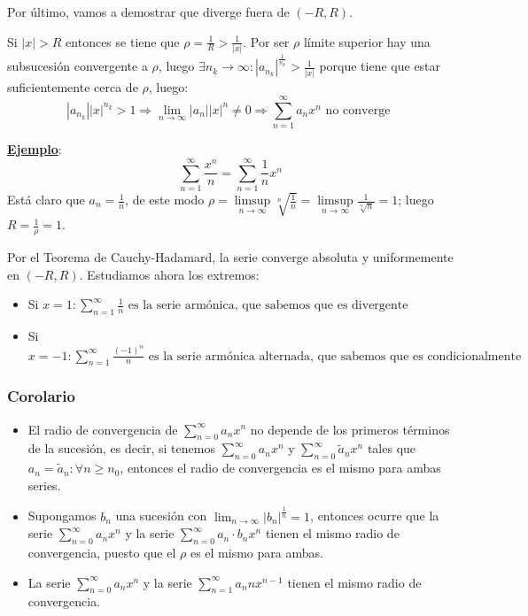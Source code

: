 \documentclass[10pt,a4paper,openright]{book}
\begin{document}
Por último, vamos a demostrar que diverge fuera de $(-R,R)$.

Si $|x| > R$ entonces se tiene que $\rho = \frac{1}{R} > \frac{1}{|x|}$. Por ser $\rho$ límite superior hay una subsucesión convergente a $\rho$, luego $\exists n_k \to \infty : |a_{n_k}|^\frac{1}{n_k} > \frac{1}{|x|}$ porque tiene que estar suficientemente cerca de $\rho$, luego:
$$|a_{n_k}| |x|^{n_k} > 1\Rightarrow \lim_{n \to \infty} |a_n||x|^n \neq 0 \Rightarrow \sum_{n=1}^{\infty} a_n x^n \mbox{ no converge }$$

\underline{\textbf{Ejemplo}}:
$$\sum_{n=1}^{\infty} \frac{x^n}{n} = \sum_{n=1}^{\infty} \frac{1}{n} x^n$$
Está claro que $a_n = \frac{1}{n}$, de este modo $\rho =  \underset{n \to \infty}\limsup \sqrt[n]{\frac{1}{n}} = \underset{n \to \infty}\limsup \frac{1}{\sqrt[n]{n}} = 1 $; luego $R = \frac{1}{\rho} = 1$.

Por el Teorema de Cauchy-Hadamard, la serie converge absoluta y uniformemente en $(-R, R)$. Estudiamos ahora los extremos:
\begin{itemize}
\item Si $x = 1 : \sum_{n=1}^{\infty} \frac{1}{n} \mbox{ es la serie armónica, que sabemos que es divergente }$

\item Si $x = -1: \sum_{n=1}^{\infty} \frac{(-1)^n}{n} \mbox{ es la serie armónica alternada, que sabemos que es condicionalmente convergente }$
\end{itemize}

\subsubsection*{Corolario}
\begin{itemize}
\item El radio de convergencia de $\sum_{n=0}^{\infty} a_n x^n$ no depende de los primeros términos de la sucesión, es decir, si tenemos $\sum_{n=0}^{\infty} a_n x^n$ y $\sum_{n=0}^{\infty} \tilde{a}_n x^n$ tales que $a_n = \tilde{a}_n : \forall n \geq n_0$, entonces el radio de convergencia es el mismo para ambas series.

\item Supongamos $b_n$ una sucesión con $\lim_{n \to \infty} |b_n|^\frac{1}{n} = 1$, entonces ocurre que la serie $\sum_{n=0}^{\infty} a_n x^n$ y la serie $\sum_{n=0}^{\infty} a_n \cdot b_n x^n$ tienen el mismo radio de convergencia, puesto que el $\rho$ es el mismo para ambas.

\item La serie $\sum_{n=0}^{\infty} a_n x^n$ y la serie $\sum_{n=1}^{\infty} a_n n x^{n-1}$ tienen el mismo radio de convergencia.
\end{itemize}
\end{document}
